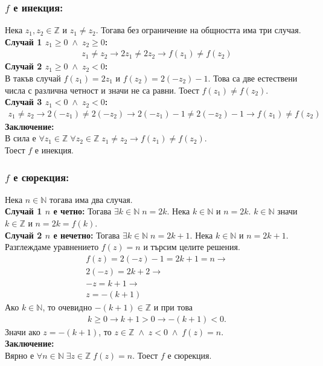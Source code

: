 \documentclass[a4paper, 12pt, oneside]{article}
\newcommand{\N}{\mathbb{N}}
\newcommand{\Z}{\mathbb{Z}}
\begin{document}
\subsubsection*{\(f\) е инекция:}
Нека \(z_1, z_2 \in \Z\) и \(z_1 \neq z_2\).
Тогава без ограничение на общността има три случая. \\
\textbf{Случай 1 \(z_1 \geq 0 \; \land \; z_2 \geq 0\):}
\begin{align*}
    z_1 \neq z_2 \longrightarrow 2z_1 \neq 2z_2 \longrightarrow f(z_1) \neq f(z_2)
\end{align*}
\textbf{Случай 2 \(z_1 \geq 0 \; \land \; z_2 < 0\):} \\
В такъв случай \(f(z_1) = 2z_1\) и \(f(z_2) =  2(-z_2) - 1\).
Това са две естествени числа с различна четност и значи не са равни.
Тоест \(f(z_1) \neq f(z_2)\). \\
\textbf{Случай 3 \(z_1 < 0 \; \land \; z_2 < 0\):}
\begin{align*}
    z_1 \neq z_2 \longrightarrow 2(-z_1) \neq 2(-z_2) \longrightarrow 2(-z_1) - 1 \neq 2(-z_2) - 1 \longrightarrow f(z_1) \neq f(z_2)
\end{align*}
\textbf{Заключение:} \\
В сила е \(\forall z_1 \in \Z \; \forall z_2 \in \Z \; z_1 \neq z_2 \longrightarrow f(z_1) \neq f(z_2)\). \\
Тоест \(f\) е инекция.
\subsubsection*{\(f\) е сюрекция:}
Нека \(n \in \N\) тогава има два случая. \\
\textbf{Случай 1 \(n\) е четно:}
Тогава \(\exists k \in \N \; n = 2k\).
Нека \(k \in \N\) и \(n = 2k\). \(k \in \N\) значи \(k \in \Z\) и \(n = 2k = f(k)\). \\
\textbf{Случай 2 \(n\) е нечетно:}
Тогава \(\exists k \in \N \; n = 2k + 1\).
Нека \(k \in \N\) и \(n = 2k + 1\). 
Разглеждаме уравнението \(f(z) = n\) и търсим целите решения.
\begin{align*}
    f(z) = 2(-z) - 1 = 2k + 1 = n  \longrightarrow \\
    2(-z) = 2k + 2 \longrightarrow \\
    -z = k + 1 \longrightarrow \\
    z = -(k + 1)
\end{align*}
Ако \(k \in \N\), то очевидно \(-(k + 1) \in \Z\) и при това
\begin{align*}
    k \geq 0 \longrightarrow k + 1 > 0 \longrightarrow -(k + 1) < 0.
\end{align*}
Значи ако \(z = -(k + 1)\), то \(z \in \Z \; \land \; z < 0 \; \land \; f(z) = n\). \\
\textbf{Заключение:} \\
Вярно е \(\forall n \in \N \; \exists z \in \Z \; f(z) = n\).
Тоест \(f\) е сюрекция.
\end{document}
